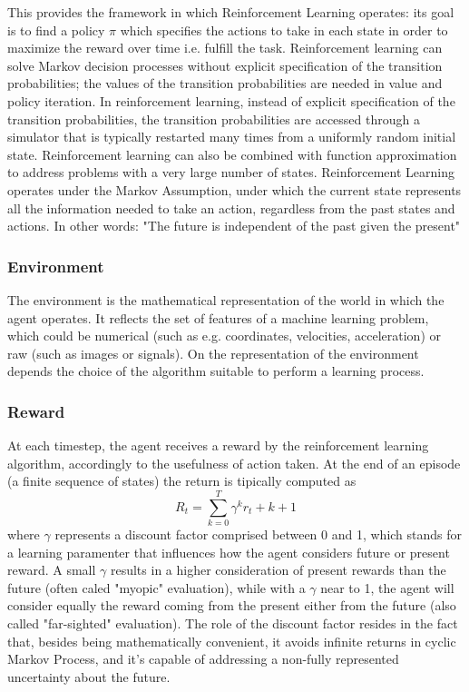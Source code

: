 This provides the framework in which Reinforcement Learning operates: its goal is to find a policy \(\pi\) which specifies the actions to take in each state in order to maximize the reward over time i.e. fulfill the task.
Reinforcement learning can solve Markov decision processes without explicit specification of the transition probabilities; the values of the transition probabilities are needed in value and policy iteration. In reinforcement learning, instead of explicit specification of the transition probabilities, the transition probabilities are accessed through a simulator that is typically restarted many times from a uniformly random initial state. Reinforcement learning can also be combined with function approximation to address problems with a very large number of states.
Reinforcement Learning operates under the Markov Assumption, under which the current state represents all the information needed to take an action, regardless from the past states and actions.
In other words: "The future is independent of the past given the present"

\subsubsection{Environment}
The environment is the mathematical representation of the world in which the agent operates. It reflects the set of features of a machine learning problem, which could be numerical (such as e.g. coordinates, velocities, acceleration) or raw (such as images or signals). On the representation of the environment depends the choice of the algorithm suitable to perform a learning process.

\subsubsection{Reward}
At each timestep, the agent receives a reward by the reinforcement learning algorithm, accordingly to the usefulness of action taken.
At the end of an episode (a finite sequence of states) the return is tipically computed as \[R_t = \sum^{T}_{k=0}\gamma^k r_t + k +1\] where \(\gamma\) represents a discount factor comprised between 0 and 1, which stands for a learning paramenter that influences how the agent considers future                              or present reward. A small \(\gamma\) results in a higher consideration of present rewards than the future (often caled "myopic" evaluation), while with a \(\gamma\) near to 1, the agent will consider equally the reward coming from the present either from the future (also called "far-sighted" evaluation). The role of the discount factor resides in the fact that, besides being mathematically convenient, it avoids infinite returns in cyclic Markov Process, and it's capable of addressing a non-fully represented uncertainty about the future.

